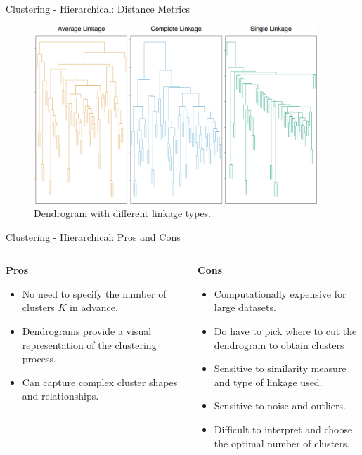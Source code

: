\begin{frame}[allowframebreaks]{Clustering - Hierarchical: Distance Metrics}
\begin{figure}
    \centering
    \includegraphics[width=0.95\textwidth,height=0.85\textheight,keepaspectratio]{images/dul/hierarchical/dendrogram-linkage-types.png}
    \caption{Dendrogram with different linkage types.}
\end{figure}
\end{frame}


\begin{frame}[allowframebreaks]{Clustering - Hierarchical: Pros and Cons}
\begin{columns}
    \begin{column}{0.5\textwidth}
        \textbf{Pros}
        \begin{itemize}
            \setlength{\itemsep}{1em}
            \item No need to specify the number of clusters $K$ in advance.
            \item Dendrograms provide a visual representation of the clustering process.
            \item Can capture complex cluster shapes and relationships.
        \end{itemize}
    \end{column}
    \begin{column}{0.5\textwidth}
        \textbf{Cons}
        \begin{itemize}
            \setlength{\itemsep}{1em}
            \item Computationally expensive for large datasets.
            \item Do have to pick where to cut the dendrogram to obtain clusters
            \item Sensitive to similarity measure and type of linkage used.
            \item Sensitive to noise and outliers.
            \item Difficult to interpret and choose the optimal number of clusters.
        \end{itemize}
    \end{column}
\end{columns}
\end{frame}

